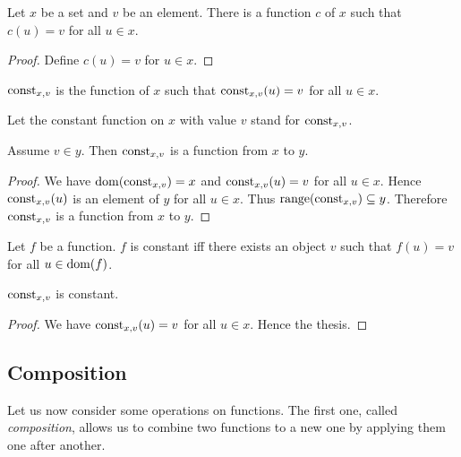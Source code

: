 \documentclass[../../set-theory.ftl.tex]{subfiles}
\begin{document}
  \begin{forthel}
    \begin{lemma}
      Let $x$ be a set and $v$ be an element.
      There is a function $c$ of $x$ such that $c(u) = v$ for all $u \in x$.
    \end{lemma}
    \begin{proof}
      Define $c(u) = v$ for $u \in x$.
    \end{proof}

    \begin{definition}
      $\mbox{const}_{x,v}$ is the function of $x$ such that $\mbox{const}_{x,v}(u) = v$ for all $u \in x$.
    \end{definition}

    Let the constant function on $x$ with value $v$ stand for $\mbox{const}_{x,v}$.

    \begin{proposition}\label{SetTheory_02_01_180417}
      Assume $v \in y$.
      Then $\mbox{const}_{x,v}$ is a function from $x$ to $y$.
    \end{proposition}
    \begin{proof}
      We have $\operatorname{dom}(\mbox{const}_{x,v}) = x$ and $\mbox{const}_{x,v}(u) = v$ for all $u \in x$.
      Hence $\mbox{const}_{x,v}(u)$ is an element of $y$ for all $u \in x$.
      Thus $\operatorname{range}(\mbox{const}_{x,v}) \subseteq y$.
      Therefore $\mbox{const}_{x,v}$ is a function from $x$ to $y$.
    \end{proof}

    \begin{definition}
      Let $f$ be a function.
      $f$ is constant iff there exists an object $v$ such that $f(u) = v$ for all $u \in \operatorname{dom}(f)$.
    \end{definition}

    \begin{proposition}\label{SetTheory_02_01_359618}
      $\mbox{const}_{x,v}$ is constant.
    \end{proposition}
    \begin{proof}
      We have $\mbox{const}_{x,v}(u) = v$ for all $u \in x$.
      Hence the thesis.
    \end{proof}
  \end{forthel}


  \subsection{Composition}

  Let us now consider some operations on functions.
  The first one, called \textit{composition}, allows us to combine two functions
  to a new one by applying them one after another.
\end{document}

